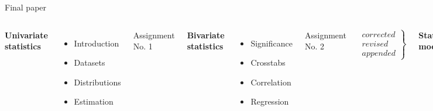\documentclass[t]{beamer}
\begin{document}
	\begin{frame}[t]{Final paper}
	
	\begin{columns}[T]
	\textbf{Univariate\\statistics}
	
	\vspace{.55em}
	\begin{itemize}
		\item Introduction
		\item Datasets
		\item Distributions
		\item Estimation
	\end{itemize}
	Assignment No. 1
	
	\textbf{Bivariate\\statistics}
	
	\begin{itemize}
		\item Significance
		\item Crosstabs
		\item Correlation
		\item Regression
	\end{itemize}
	Assignment No. 2
	
	$$
	\left.
    \begin{array}{rrr}
        corrected \\
        revised\\
        appended
    \end{array}
	\right \} 
	$$

	\textbf{Statistical\\modelling}
	

\end{columns}
\end{frame}
\end{document}

